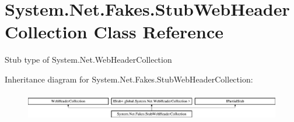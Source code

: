 \hypertarget{class_system_1_1_net_1_1_fakes_1_1_stub_web_header_collection}{\section{System.\-Net.\-Fakes.\-Stub\-Web\-Header\-Collection Class Reference}
\label{class_system_1_1_net_1_1_fakes_1_1_stub_web_header_collection}
}


Stub type of System.\-Net.\-Web\-Header\-Collection 


Inheritance diagram for System.\-Net.\-Fakes.\-Stub\-Web\-Header\-Collection\-:\begin{figure}[H]
\begin{center}
\leavevmode
\includegraphics[height=1.244444cm]{class_system_1_1_net_1_1_fakes_1_1_stub_web_header_collection}
\end{center}
\end{figure}
